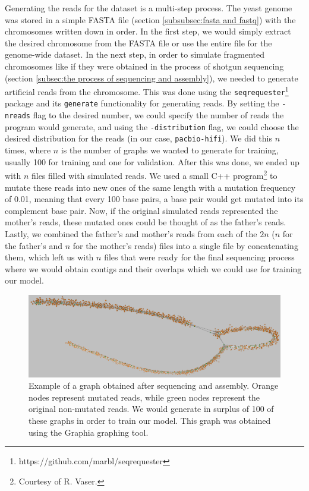 \documentclass[times, utf8, diplomski, english]{fer_eng}
\begin{document}
Generating the reads for the dataset is a multi-step process. The yeast genome was stored in a simple FASTA file (section \ref{subsubsec:fasta and fastq}) with the chromosomes written down in order. In the first step, we would simply extract the desired chromosome from the FASTA file or use the entire file for the genome-wide dataset. In the next step, in order to simulate fragmented chromosomes like if they were obtained in the process of shotgun sequencing (section \ref{subsec:the process of sequencing and assembly}), we needed to generate artificial reads from the chromosome. This was done using the \texttt{seqrequester}\footnote{https://github.com/marbl/seqrequester} package and its \texttt{generate} functionality for generating reads. By setting the \texttt{-nreads} flag to the desired number, we could specify the number of reads the program would generate, and using the \texttt{-distribution} flag, we could choose the desired distribution for the reads (in our case, \texttt{pacbio-hifi}). We did this $n$ times, where $n$ is the number of graphs we wanted to generate for training, usually 100 for training and one for validation. After this was done, we ended up with $n$ files filled with simulated reads. We used a small C++ program\footnote{Courtesy of R. Vaser.} to mutate these reads into new ones of the same length with a mutation frequency of 0.01, meaning that every 100 base pairs, a base pair would get mutated into its complement base pair. Now, if the original simulated reads represented the mother's reads, these mutated ones could be thought of as the father's reads. Lastly, we combined the father's and mother's reads from each of the $2n$ ($n$ for the father's and $n$ for the mother's reads) files into a single file by concatenating them, which left us with $n$ files that were ready for the final sequencing process where we would obtain contigs and their overlaps which we could use for training our model.

\begin{figure}[h]
	\centering
	\includegraphics[width=\textwidth]{images/graph_example.png}
	\caption[Graph]{Example of a graph obtained after sequencing and assembly. Orange nodes represent mutated reads, while green nodes represent the original non-mutated reads. We would generate in surplus of 100 of these graphs in order to train our model. This graph was obtained using the Graphia\footnotemark{} graphing tool.}
	\label{fig:graph}
\end{figure}
\end{document}
